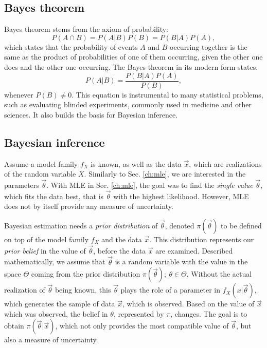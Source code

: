 \subsection{Bayes theorem}

Bayes theorem stems from the axiom of probability:
\begin{equation}
    P(A \cap B) = P(A|B)P(B) = P(B|A)P(A),
\end{equation}
which states that the probability of events $A$ and $B$ occurring together is the same as the product of probabilities of one of them occurring, given the other one does and the other one occurring. The Bayes theorem  \citep{bayes1763essay} in its modern form states:
\begin{equation}
    P(A|B) = \frac{P(B|A)P(A)}{P(B)},
    \label{eq:bayes_theorem}
\end{equation}
whenever $P(B) \neq 0$. This equation is instrumental to many statistical problems, such as evaluating blinded experiments, commonly used in medicine and other sciences. It also builds the basis for Bayesian inference.

\subsection{Bayesian inference}

Assume a model family $f_X$ is known, as well as the data $\vec{x}$, which are realizations of the random variable $X$. Similarly to Sec. \ref{ch:mle}, we are interested in the parameters $\vec{\theta}$. With MLE in Sec. \ref{ch:mle}, the goal was to find the \textit{single value} $\vec{\theta}$, which fits the data best, that is $\vec{\theta}$ with the highest likelihood. However, MLE does not by itself provide any measure of uncertainty. 

Bayesian estimation needs a \textit{prior distribution} of $\vec{\theta}$, denoted $\pi(\vec{\theta})$ to be defined on top of the model family $f_X$ and the data $\vec{x}$. This distribution represents our \textit{prior belief} in the value of $\vec{\theta}$, before the data $\vec{x}$ are examined. Described mathematically, we assume that $\vec{\theta}$ is a random variable with the value in the space $\Theta$ coming from the prior distribution $\pi(\vec{\theta}); \ \theta \in \Theta$. Without the actual realization of $\vec{\theta}$ being known, this $\vec{\theta}$ plays the role of a parameter in $f_X(x|\vec{\theta})$, which generates the sample of data $\vec{x}$, which is observed. Based on the value of $\vec{x}$ which was observed, the belief in $\theta$, represented by $\pi$, changes. The goal is to obtain $\pi(\vec{\theta}|\vec{x})$, which not only provides the most compatible value of $\vec{\theta}$, but also a measure of uncertainty. 

